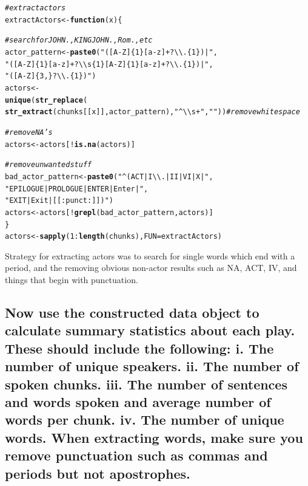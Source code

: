 \documentclass{article}\usepackage[]{graphicx}\usepackage[]{color}
\makeatletter
\newcommand{\hlnum}[1]{\textcolor[rgb]{0.686,0.059,0.569}{#1}}%
\newcommand{\hlstr}[1]{\textcolor[rgb]{0.192,0.494,0.8}{#1}}%
\newcommand{\hlcom}[1]{\textcolor[rgb]{0.678,0.584,0.686}{\textit{#1}}}%
\newcommand{\hlopt}[1]{\textcolor[rgb]{0,0,0}{#1}}%
\newcommand{\hlstd}[1]{\textcolor[rgb]{0.345,0.345,0.345}{#1}}%
\newcommand{\hlkwa}[1]{\textcolor[rgb]{0.161,0.373,0.58}{\textbf{#1}}}%
\newcommand{\hlkwb}[1]{\textcolor[rgb]{0.69,0.353,0.396}{#1}}%
\newcommand{\hlkwc}[1]{\textcolor[rgb]{0.333,0.667,0.333}{#1}}%
\newcommand{\hlkwd}[1]{\textcolor[rgb]{0.737,0.353,0.396}{\textbf{#1}}}%
\newenvironment{kframe}{%
 \def\at@end@of@kframe{}%
 \ifinner\ifhmode%
  \def\at@end@of@kframe{\end{minipage}}%
  \begin{minipage}{\columnwidth}%
 \fi\fi%
 \def\FrameCommand##1{\hskip\@totalleftmargin \hskip-\fboxsep
 \colorbox{shadecolor}{##1}\hskip-\fboxsep
     \hskip-\linewidth \hskip-\@totalleftmargin \hskip\columnwidth}%
 \MakeFramed {\advance\hsize-\width
   \@totalleftmargin\z@ \linewidth\hsize
   \@setminipage}}%
 {\par\unskip\endMakeFramed%
 \at@end@of@kframe}
\newenvironment{knitrout}{}{} %
\makeatother
\begin{document}
\begin{knitrout}
\color{fgcolor}\begin{kframe}
\begin{alltt}
\hlcom{#extract actors}
\hlstd{extractActors} \hlkwb{<-}  \hlkwa{function}\hlstd{(}\hlkwc{x}\hlstd{) \{}

    \hlcom{#search for JOHN., KING JOHN., Rom. , etc}
    \hlstd{actor_pattern} \hlkwb{<-} \hlkwd{paste0}\hlstd{(}\hlstr{"([A-Z]\{1\}[a-z]+?\textbackslash{}\textbackslash{}.\{1\})|"}\hlstd{,}
                            \hlstr{"([A-Z]\{1\}[a-z]+?\textbackslash{}\textbackslash{}s\{1\}[A-Z]\{1\}[a-z]+?\textbackslash{}\textbackslash{}.\{1\})|"}\hlstd{,}
                            \hlstr{"([A-Z ]\{3,\}?\textbackslash{}\textbackslash{}.\{1\})"}\hlstd{)}
    \hlstd{actors} \hlkwb{<-}
        \hlkwd{unique}\hlstd{(}\hlkwd{str_replace}\hlstd{(}
            \hlkwd{str_extract}\hlstd{(chunks[[x]], actor_pattern),}\hlstr{"^\textbackslash{}\textbackslash{}s+"}\hlstd{,} \hlstr{""}\hlstd{))} \hlcom{#remove whitespace}

    \hlcom{#remove NA's}
    \hlstd{actors} \hlkwb{<-} \hlstd{actors[}\hlopt{!}\hlkwd{is.na}\hlstd{(actors)]}

    \hlcom{#remove unwanted stuff}
    \hlstd{bad_actor_pattern} \hlkwb{<-} \hlkwd{paste0}\hlstd{(}\hlstr{"^(ACT|I\textbackslash{}\textbackslash{}.|II|VI|X|"}\hlstd{,}
                                \hlstr{"EPILOGUE|PROLOGUE|ENTER|Enter|"}\hlstd{,}
                                \hlstr{"EXIT|Exit|[[:punct:]])"}\hlstd{)}
    \hlstd{actors} \hlkwb{<-} \hlstd{actors[}\hlopt{!}\hlkwd{grepl}\hlstd{(bad_actor_pattern, actors)]}
\hlstd{\}}
\hlstd{actors} \hlkwb{<-} \hlkwd{sapply}\hlstd{(}\hlnum{1}\hlopt{:}\hlkwd{length}\hlstd{(chunks),} \hlkwc{FUN} \hlstd{= extractActors)}
\end{alltt}
\end{kframe}
\end{knitrout}


Strategy for extracting actors was to search for single words which end with a period, and the removing obvious non-actor results such as NA, ACT, IV, and things that begin with punctuation.

\subsection{Now use the constructed data object to calculate summary statistics about each play. These should include the following: i. The number of unique speakers. ii. The number of spoken chunks. iii. The number of sentences and words spoken and average number of words per chunk. iv. The number of unique words. When extracting words, make sure you remove punctuation such as commas and periods but not apostrophes.} %
\end{document}
